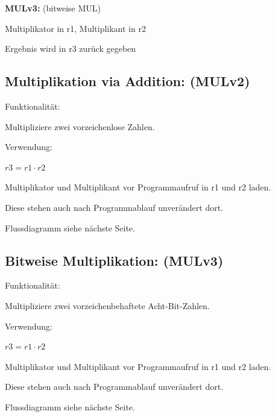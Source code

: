 \documentclass[fleqn, a4paper, 11pt]{article}       %
\begin{document}
 \noindent \textbf{MULv3:}  (bitweise MUL)
 \begin{compactitem}
     \item Multiplikator in r1, Multiplikant in r2
     \item Ergebnis wird in r3 zurück gegeben
     \end{compactitem}


\newpage

\subsection{Multiplikation via Addition: (MULv2)\label{A.MULv2}}
Funktionalität: 

Multipliziere zwei vorzeichenlose Zahlen.
\vspace{0.25cm}

\noindent Verwendung:
\begin{compactitem}
    \item $r3 = r1 \cdot r2$
	\item Multiplikator und Multiplikant vor Programmaufruf  in r1  und r2 laden.
	\item Diese stehen auch nach Programmablauf unverändert   dort.
\end{compactitem}
\vspace{0.25cm}
\noindent Flussdiagramm siehe nächste Seite.

\thispagestyle{empty}


\newpage

\subsection{Bitweise Multiplikation: (MULv3)\label{A.MULv3}}
Funktionalität:

Multipliziere zwei vorzeichenbehaftete Acht-Bit-Zahlen.
\vspace{0.25cm}

\noindent Verwendung:
\begin{compactitem}
	\item $r3 = r1 \cdot r2$
	\item Multiplikator und Multiplikant vor Programmaufruf in r1 und r2 laden.
	\item Diese stehen auch nach Programmablauf unverändert                dort.
\end{compactitem}
\vspace{0.25cm}
\noindent Flussdiagramm siehe nächste Seite.




\thispagestyle{empty}


\thispagestyle{empty}






\newpage

\printbibliography  %
\end{document}
